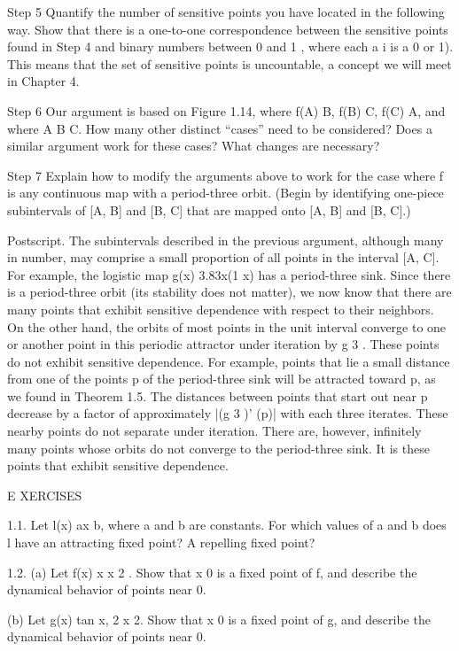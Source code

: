 \documentclass[12pt]{article}
\begin{document}
Step 5 Quantify the number of sensitive points you have located in the following way. Show that there is a 
one-to-one correspondence between the sensitive points found in Step 4 and binary numbers between 0 and 1 
, where each a i is a 0 or 1). This means that the set of sensitive points is uncountable, a concept we 
will meet in Chapter 4.

Step 6 Our argument is based on Figure 1.14, where f(A)  B, f(B)  C, f(C)  A, and where A  B  C. How many 
other distinct “cases” need to be considered? Does a similar argument work for these cases? What changes 
are necessary?

Step 7 Explain how to modify the arguments above to work for the case where f is any continuous map with a 
period-three orbit. (Begin by identifying one-piece subintervals of [A, B] and [B, C] that are mapped onto 
[A, B] and [B, C].)

Postscript. The subintervals described in the previous argument, although many in number, may comprise a 
small proportion of all points in the interval [A, C]. For example, the logistic map g(x)  3.83x(1  x) has 
a period-three sink. Since there is a period-three orbit (its stability does not matter), we now know that 
there are many points that exhibit sensitive dependence with respect to their neighbors. On the other hand, 
the orbits of most points in the unit interval converge to one or another point in this periodic attractor 
under iteration by g 3 . These points do not exhibit sensitive dependence. For example, points that lie a 
small distance from one of the points p of the period-three sink will be attracted toward p, as we found in 
Theorem 1.5. The distances between points that start out near p decrease by a factor of approximately |(g 3 
)' (p)| with each three iterates. These nearby points do not separate under iteration. There are, however, 
infinitely many points whose orbits do not converge to the period-three sink. It is these points that 
exhibit sensitive dependence.

E XERCISES

1.1. Let l(x)  ax b, where a and b are constants. For which values of a and b does l have an attracting 
fixed point? A repelling fixed point?

1.2. (a) Let f(x)  x  x 2 . Show that x  0 is a fixed point of f, and describe the dynamical behavior of 
points near 0.

(b) Let g(x)  tan x,  
  2  x  
  2. Show that x  0 is a fixed point of g, and describe the dynamical behavior of points near 0.
\end{document}
